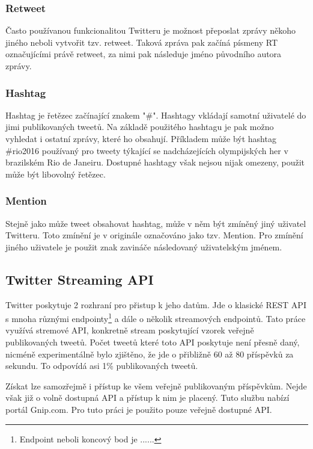 \documentclass[thesis=B,czech]{FITthesis}[2012/06/26]
\begin{document}
\subsubsection{Retweet}

	Často používanou funkcionalitou Twitteru je možnost přeposlat zprávy někoho jiného neboli vytvořit tzv. retweet. Taková zpráva pak začíná písmeny RT označujícími právě retweet, za nimi pak následuje jméno původního autora zprávy. 


\subsubsection{Hashtag}

	Hashtag je řetězec začínající znakem "\#". Hashtagy vkládají samotní uživatelé do jimi publikovaných tweetů. Na základě použitého hashtagu je pak možno vyhledat i ostatní zprávy, které ho obsahují. Příkladem může být hashtag \#rio2016 používaný pro tweety týkající se nadcházejících olympijských her v brazilském Rio de Janeiru. Dostupné hashtagy však nejsou nijak omezeny, použit může být libovolný řetězec. 


\subsubsection{Mention}

	Stejně jako může tweet obsahovat hashtag, může v něm být zmíněný jiný uživatel Twitteru. Toto zmínění je v originále označováno jako tzv. Mention. Pro zmínění jiného uživatele je použit znak zavináče následovaný uživatelským jménem. 


\subsection{Twitter Streaming API}
\label{twitter-api}
	Twitter poskytuje 2 rozhraní pro přistup k jeho datům. Jde o klasické REST API s mnoha různými endpointy\footnote{Endpoint neboli koncový bod je ......} a dále o několik streamových endpointů. Tato práce využívá stremové API, konkretně stream poskytující vzorek veřejně publikovaných tweetů\cite{twitter-api}. Počet tweetů které toto API poskytuje není přesně daný, nicméně experimentálně bylo zjištěno, že jde o přibližně 60 až 80 příspěvků za sekundu. To odpovídá asi 1\% publikovaných tweetů. 
	
	Získat lze samozřejmě i přístup ke všem veřejně publikovaným příspěvkům. Nejde však již o volně dostupná API a přístup k nim je placený. Tuto službu nabízí portál Gnip.com\cite{gnip}. Pro tuto práci je použito pouze veřejně dostupné API. 
	
\end{document}
